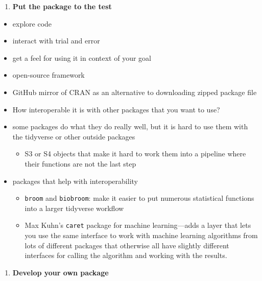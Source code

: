 \documentclass[10pt,letterpaper]{article}
\providecommand{\tightlist}{%
  \setlength{\itemsep}{0pt}\setlength{\parskip}{0pt}}
\begin{document}
\begin{enumerate}
\def\labelenumi{\arabic{enumi}.}
\setcounter{enumi}{8}
\tightlist
\item
  \textbf{Put the package to the test}
\end{enumerate}

\begin{itemize}
\tightlist
\item
  explore code
\item
  interact with trial and error
\item
  get a feel for using it in context of your goal
\item
  open-source framework
\item
  GitHub mirror of CRAN as an alternative to downloading zipped package
  file
\item
  How interoperable it is with other packages that you want to use?
\item
  some packages do what they do really well, but it is hard to use them
  with the tidyverse or other outside packages

  \begin{itemize}
  \tightlist
  \item
    S3 or S4 objects that make it hard to work them into a pipeline
    where their functions are not the last step
  \end{itemize}
\item
  packages that help with interoperability

  \begin{itemize}
  \tightlist
  \item
    \texttt{broom} and \texttt{biobroom}: make it easier to put numerous
    statistical functions into a larger tidyverse workflow
  \item
    Max Kuhn's \texttt{caret} package for machine learning---adds a
    layer that lets you use the same interface to work with machine
    learning algorithms from lots of different packages that otherwise
    all have slightly different interfaces for calling the algorithm and
    working with the results.
  \end{itemize}
\end{itemize}

\begin{enumerate}
\def\labelenumi{\arabic{enumi}.}
\setcounter{enumi}{9}
\tightlist
\item
  \textbf{Develop your own package}
\end{enumerate}
\end{document}
